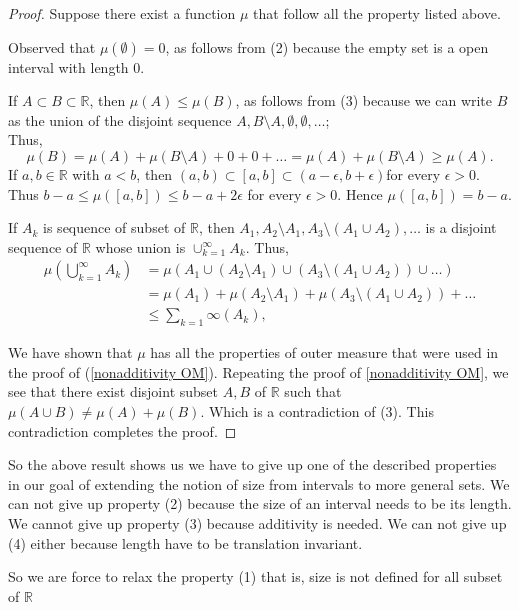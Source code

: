 \begin{proof}
    Suppose there exist a function $\mu$ that follow all the property listed above.

    Observed that $\mu(\emptyset)=0$, as follows from (2) because the empty set is a open interval with length 0.

    If $A\subset B\subset \mathds{R}$, then $\mu(A)\le \mu(B)$, as follows from (3) because we can write $B$ as the union of the disjoint sequence $A,B\setminus A,\emptyset,\emptyset,\ldots$;\\
    Thus,
    \[
    \mu(B)=\mu(A)+\mu(B\setminus A)+0+0+\ldots=\mu(A)+\mu(B\setminus A)\ge \mu(A).
    \]
    If $a,b\in \mathds{R}$ with $a<b$, then $(a,b)\subset [a,b]\subset (a-\epsilon,b+\epsilon)$for every $\epsilon>0$. Thus $b-a\le \mu([a,b])\le b-a+2\epsilon$ for every $\epsilon>0$.
    Hence $\mu([a,b])=b-a$.

    If ${A_k}$ is sequence of subset of $\mathds{R}$, then $A_1,A_2\setminus A_1,A_3\setminus (A_1\cup A_2),\ldots$ is a disjoint sequence of $\mathds{R}$ whose union is $\cup_{k=1}^{\infty}A_k$. Thus,
    \begin{align*}
        \mu\left(\bigcup_{k=1}^{\infty}A_k\right)&=\mu(A_1\cup(A_2\setminus A_1)\cup(A_3\setminus (A_1\cup A_2))\cup\ldots)\\
        &=\mu(A_1)+\mu(A_2\setminus A_1)+\mu(A_3\setminus (A_1\cup A_2))+\ldots\\
        &\le\sum_{k=1}{\infty}(A_k),
    \end{align*}

    We have shown that $\mu$ has all the properties of outer measure  that were used in the proof of (\ref{nonadditivity OM}). Repeating the proof of \ref{nonadditivity OM}, we see that there exist disjoint subset $A,B$ of $\mathds{R}$ such that $\mu(A\cup B)\neq\mu(A)+\mu(B)$. Which is a contradiction of (3). This contradiction completes the proof.
\end{proof}
So the above result shows us we have to give up one of the described properties in our goal of extending the notion of size from intervals to more general sets. 
We can not give up property (2) because the size of an interval needs to be its length. We cannot give up property (3) because additivity is needed. We can not give up (4) either because length have to be translation invariant.


So we are force to relax the property (1) that is, size is not defined for all subset of $\mathds{R}$ 
